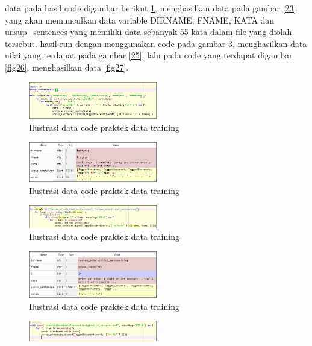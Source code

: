 \begin{enumerate}
data pada hasil code digambar berikut \ref{fig22}, menghasilkan data pada gambar \ref{23} yang akan memunculkan data variable DIRNAME, FNAME, KATA dan unsup\_sentences yang memiliki data sebanyak 55 kata dalam file yang diolah tersebut. hasil run dengan menggunakan code pada gambar \ref{fig24}, menghasilkan data nilai yang terdapat pada gambar \ref{25}. lalu pada code yang terdapat digambar \ref{fig26}, menghasilkan data \ref{fig27}.
\begin{figure}[!htbp]
	\centering
	\includegraphics[width=0.5\textwidth]{figures/fathi/chapter5/hari3/3}
	\caption{Ilustrasi data code praktek data training }
	\label{fig22}
\end{figure}
\begin{figure}[!htbp]
	\centering
	\includegraphics[width=0.5\textwidth]{figures/fathi/chapter5/hari3/4}
	\caption{Ilustrasi data code praktek data training }
	\label{fig23}
\end{figure}
\begin{figure}[!htbp]
	\centering
	\includegraphics[width=0.5\textwidth]{figures/fathi/chapter5/hari3/5}
	\caption{Ilustrasi data code praktek data training }
	\label{fig24}
\end{figure}
\begin{figure}[!htbp]
	\centering
	\includegraphics[width=0.5\textwidth]{figures/fathi/chapter5/hari3/6}
	\caption{Ilustrasi data code praktek data training }
	\label{fig25}
\end{figure}
\begin{figure}[!htbp]
	\centering
	\includegraphics[width=0.5\textwidth]{figures/fathi/chapter5/hari3/7}

\end{figure}
\end{enumerate}
